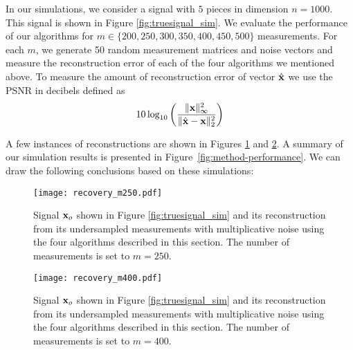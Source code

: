 \documentclass[onecolumn]{IEEEtran}
\begin{document}
In our simulations, we consider a signal with $5$ pieces in dimension $n =1000$. This signal is shown in Figure \ref{fig:truesignal_sim}. We evaluate the performance of our algorithms for $m \in \{200, 250, 300, 350, 400, 450, 500 \}$ measurements. For each $m$, we generate 50 random measurement matrices and noise vectors and measure the reconstruction error of each of the four algorithms we mentioned above. To measure the amount of reconstruction error of vector $\hat{{\bf x}}$ we use the PSNR in decibels defined as
\[
10 \log_{10} \left(\frac{\|{\bf x}\|^2_{\infty}}{\|\hat{{\bf x}} -{\bf x}\|_2^2} \right)
\]


A few instances of reconstructions are shown in Figures \ref{fig:truesignal_vs_recon250} and \ref{fig:truesignal_vs_recon400}. A summary of our simulation results is presented in Figure~\ref{fig:method-performance}. We can draw the following conclusions based on these simulations:

\begin{figure}
\begin{center}
\texttt{[image: recovery\_m250.pdf]}
\caption{Signal ${\bf x}_o$ shown in Figure \ref{fig:truesignal_sim} and its reconstruction from its undersampled measurements with multiplicative noise using the four algorithms described in this section. The number of measurements is set to $m =250$.\label{fig:truesignal_vs_recon250}}
\end{center}
\end{figure}

\begin{figure}
\begin{center}
\texttt{[image: recovery\_m400.pdf]}
\caption{Signal ${\bf x}_o$ shown in Figure \ref{fig:truesignal_sim} and its reconstruction from its undersampled measurements with multiplicative noise using the four algorithms described in this section. The number of measurements is set to $m =400$. \label{fig:truesignal_vs_recon400}}
\end{center}
\end{figure}
\end{document}
